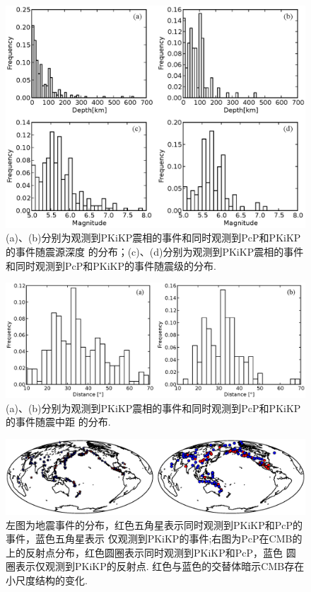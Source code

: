 \begin{figure}
	\centering
	\includegraphics[width=0.85\linewidth]{fig/chap4/depmag_hist1.eps}
	\caption{(a)、(b)分别为观测到PKiKP震相的事件和同时观测到PcP和PKiKP的事件随震源深度%
的分布；(c)、(d)分别为观测到PKiKP震相的事件和同时观测到PcP和PKiKP的事件随震级的分布. }
	\label{dep_mag_hist}
\end{figure}

\begin{figure}
	\centering
	\includegraphics[width=0.85\linewidth]{fig/chap4/dist_hist1.eps}
	\caption{(a)、(b)分别为观测到PKiKP震相的事件和同时观测到PcP和PKiKP的事件随震中距%
的分布. }
	\label{dis_hist}
\end{figure}

\begin{figure}
	\centering
	\includegraphics[width=\linewidth]{fig/chap4/loc_distri.eps}
	\caption{左图为地震事件的分布，红色五角星表示同时观测到PKiKP和PcP的事件，蓝色五角星表示%
仅观测到PKiKP的事件;右图为PcP在CMB的上的反射点分布，红色圆圈表示同时观测到PKiKP和PcP，蓝色%
圆圈表示仅观测到PKiKP的反射点. 红色与蓝色的交替体暗示CMB存在小尺度结构的变化. }
	\label{loc_distri}
\end{figure}

